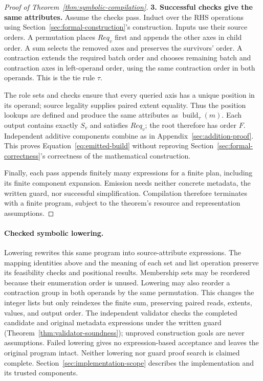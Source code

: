 \begin{proof}[Proof of Theorem~\ref{thm:symbolic-compilation}]
\noindent\textbf{3. Successful checks give the same attributes.}
Assume the checks pass. Induct over the RHS operations using
Section~\ref{sec:formal-construction}'s construction. Inputs use their
source orders. A permutation places $Req_v$ first and appends the other
axes in child order. A sum selects the removed axes and preserves the
survivors' order. A contraction extends the required batch order and
chooses remaining batch and contraction axes in left-operand order,
using the same contraction order in both operands. This is the tie rule
$\tau$.

The role sets and checks ensure that every queried axis has a unique
position in its operand; source legality supplies paired extent equality.
Thus the position lookups are defined and produce the same attributes as
$\operatorname{build}_{\tau}(m)$. Each output contains exactly $S_v$ and
satisfies $Req_v$; the root therefore has order $F$. Independent additive
components combine as in Appendix~\ref{sec:addition-proof}. This proves
Equation~\eqref{eq:emitted-build} without reproving Section~\ref{sec:formal-correctness}'s
correctness of the mathematical construction.

Finally, each pass appends finitely many expressions for a finite plan,
including its finite component expansion. Emission needs neither concrete
metadata, the written guard, nor successful simplification. Compilation
therefore terminates with a finite program, subject to the theorem's
resource and representation assumptions.
\end{proof}

\paragraph{Checked symbolic lowering.}
Lowering rewrites this same program into source-attribute expressions.
The mapping identities above and the meaning of each set and list
operation preserve its feasibility checks and positional results.
Membership sets may be reordered because their enumeration order is unused.
Lowering may also reorder a contraction group in both operands by the same
permutation. This changes the integer lists but only reindexes the finite
sum, preserving paired reads, extents, values, and output order.
The independent validator checks the completed candidate and original
metadata expressions under the written guard
(Theorem~\ref{thm:validator-soundness}); unproved construction goals are
never assumptions. Failed lowering gives no expression-based acceptance
and leaves the original program intact. Neither lowering nor guard proof
search is claimed complete. Section~\ref{sec:implementation-scope} describes
the implementation and its trusted components.
